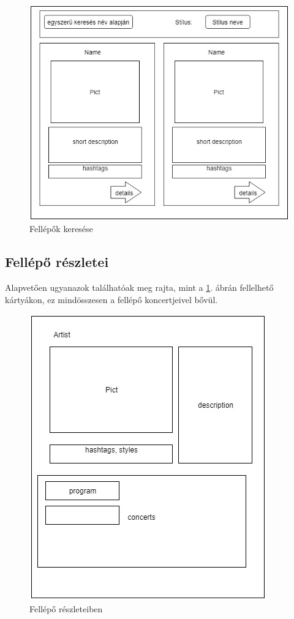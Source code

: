 \begin{figure}
\centering
\includegraphics[scale=0.5]{kepek/artist_search.jpg}
\caption{Fellépők keresése}
\label{fig:artist_search}
\end{figure}

\subsection{Fellépő részletei}

Alapvetően ugyanazok találhatóak meg rajta, mint a \ref{fig:artist_search}. ábrán fellelhető kártyákon, ez mindösszesen a fellépő koncertjeivel bővül.

\begin{figure}
\centering
\includegraphics[scale=0.5]{kepek/artist_details.jpg}
\caption{Fellépő részleteiben}
\label{fig:artist_details}
\end{figure}

